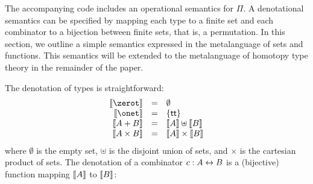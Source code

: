 \noindent The accompanying code includes an operational semantics for $\Pi$. A denotational semantics can be
specified by mapping each type to a finite set and each combinator to a bijection between finite sets, that is, a
permutation. In this section, we outline a simple semantics expressed in the metalanguage of sets and functions. This
semantics will be extended to the metalanguage of homotopy type theory in the remainder of the paper.

The denotation of types is straightforward:
\[\begin{array}{rcl}
\denot{\zerot} &=& \emptyset \\
\denot{\onet} &=& \{ \Acon{tt} \} \\
\denot{A + B} &=& \denot{A} \uplus \denot{B} \\
\denot{A \times B} &=& \denot{A} \times \denot{B}
\end{array}\]
where $\emptyset$ is the empty set, $\uplus$ is the disjoint union of sets, and $\times$ is the cartesian product of
sets. The denotation of a combinator $c : A \leftrightarrow B$ is a (bijective) function mapping $\llbracket A \rrbracket$ to $\llbracket B \rrbracket$:
